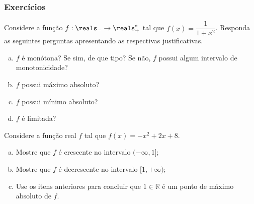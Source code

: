 	\begin{frame}
	\frametitle{Exercícios} 

	  \begin{exercicio}
		  Considere a função $f: \reals_- \to \reals^\ast_+$ tal que $f(x) = \dfrac{1}{1+x^2}$. Responda as seguintes perguntas apresentando as respectivas justificativas.
		  \begin{enumerate}[a)]
		  \item $f$ é monótona? Se sim, de que tipo? Se não, $f$ possui algum intervalo de monotonicidade?
		  \item $f$ possui máximo absoluto?
		  \item $f$ possui mínimo absoluto?
		  \item $f$ é limitada?
		  \end{enumerate}
	  \end{exercicio}
	  
	  \begin{exercicio}
		Considere a função real $f$ tal que $f(x) = -x^2 +2x +8$.
	  \begin{enumerate}[a)]
	  \item Mostre que $f$ é crescente no intervalo $( - \infty , 1]$;
	  \item Mostre que $f$ é decrescente no intervalo $[1, + \infty )$;
	  \item Use os itens anteriores para concluir que $1 \in \mathbb R$ é um ponto de máximo absoluto de $f$.
	  \end{enumerate}  
	  \end{exercicio}

	\end{frame}


	

